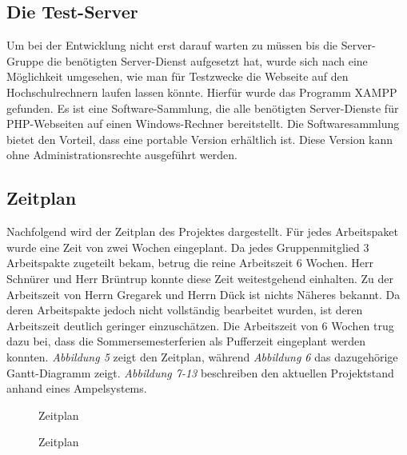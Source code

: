 \subsection{Die Test-Server}
Um bei der Entwicklung nicht erst darauf warten zu müssen bis die Server-Gruppe die benötigten Server-Dienst aufgesetzt hat, wurde sich nach eine Möglichkeit umgesehen, wie man für Testzwecke die Webseite auf den Hochschulrechnern laufen lassen könnte. Hierfür wurde das Programm XAMPP gefunden. Es ist eine Software-Sammlung, die alle benötigten Server-Dienste für PHP-Webseiten auf einen Windows-Rechner bereitstellt. Die Softwaresammlung bietet den Vorteil, dass eine portable Version erhältlich ist. Diese Version kann ohne Administrationsrechte ausgeführt werden.

\subsection{Zeitplan}
Nachfolgend wird der Zeitplan des Projektes dargestellt. Für jedes Arbeitspaket wurde eine Zeit von zwei Wochen eingeplant. Da jedes Gruppenmitglied 3 Arbeitspakte zugeteilt bekam, betrug die reine Arbeitszeit 6 Wochen. Herr Schnürer und Herr Brüntrup konnte diese Zeit weitestgehend einhalten. Zu der Arbeitszeit von Herrn Gregarek und Herrn Dück  ist nichts Näheres bekannt. Da deren Arbeitspakte jedoch nicht vollständig bearbeitet wurden, ist deren Arbeitszeit deutlich geringer einzuschätzen. Die Arbeitszeit von 6 Wochen trug dazu bei, dass die Sommersemesterferien als Pufferzeit eingeplant werden konnten. \textit{Abbildung 5} zeigt den Zeitplan, während \textit{Abbildung 6} das dazugehörige Gantt-Diagramm zeigt. \textit{Abbildung 7-13} beschreiben den aktuellen Projektstand anhand eines Ampelsystems.

\begin{figure}[H] 
  \centering
  \caption{Zeitplan}
\end{figure}

\begin{figure}[H] 
  \centering
  \caption{Zeitplan}
\end{figure}

